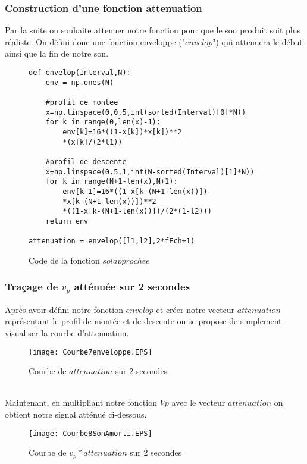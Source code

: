 \documentclass[12pt]{article}
\begin{document}
\subsubsection{Construction d'une fonction attenuation}
Par la suite on souhaite attenuer notre fonction pour que le son produit soit plus réaliste. On défini donc une fonction enveloppe ("$envelop$") qui attenuera le début ainsi que la fin de notre son.
\begin{figure}[h]
\centering
\begin{minipage}{13cm} %
\begin{lstlisting}[style=stylepython]
def envelop(Interval,N):
    env = np.ones(N)
    
    #profil de montee
    x=np.linspace(0,0.5,int(sorted(Interval)[0]*N))
    for k in range(0,len(x)-1):
        env[k]=16*((1-x[k])*x[k])**2
        *(x[k]/(2*l1))
    				
    #profil de descente
    x=np.linspace(0.5,1,int(N-sorted(Interval)[1]*N))
    for k in range(N+1-len(x),N+1):
        env[k-1]=16*((1-x[k-(N+1-len(x))])
        *x[k-(N+1-len(x))])**2
        *((1-x[k-(N+1-len(x))])/(2*(1-l2)))
    return env

attenuation = envelop([l1,l2],2*fEch+1)

\end{lstlisting}
\end{minipage} %
\caption{Code de la fonction $solapprochee$}
\end{figure}
\newpage
\subsubsection{Traçage de $v_p$ atténuée sur 2 secondes}
Après avoir défini notre fonction $envelop$ et créer notre vecteur $attenuation$ représentant le profil de montée et de descente on se propose de simplement visualiser la courbe d'attenuation.
\begin{figure}[h]
\centering
\texttt{[image: Courbe7enveloppe.EPS]}\\
\caption{Courbe de $attenuation$ sur 2 secondes}
\end{figure} \\
Maintenant, en multipliant notre fonction $Vp$ avec le vecteur $attenuation$ on obtient notre  signal atténué ci-dessous.
\begin{figure}[h]
\centering
\texttt{[image: Courbe8SonAmorti.EPS]}\\
\caption{Courbe de $v_p*attenuation$ sur 2 secondes}
\end{figure}
\end{document}
